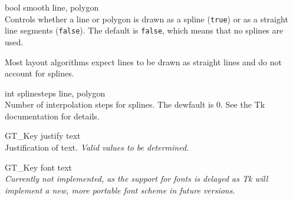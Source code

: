 \documentclass[twoside,fleqn]{report}
\begin{document}
\begin{CAttributes}
  \item[bool smooth] \hfill
  {\footnotesize line, polygon} \\
  Controls whether a line or polygon is drawn as a spline 
  (\texttt{true}) or as a straight line segments (\texttt{false}). 
  The default is \texttt{false}, which means that no splines are used.
  \begin{note}
  Most layout algorithms expect lines to be drawn as straight lines 
  and do not account for splines.
  \end{note}
      
  \item[int splinesteps] \hfill
  {\footnotesize line, polygon} \\
  Number of interpolation steps for splines.  The dewfault is 0.  See 
  the Tk documentation for details.
      
  \item[GT\_Key justify] \hfill
  {\footnotesize text} \\
  Justification of text. \emph{Valid values to be determined.}
      
  \item[GT\_Key font] \hfill
  {\footnotesize text} \\
  \emph{Currently not implemented, as the support for fonts is delayed 
  as Tk will implement a new, more portable font scheme in future 
  versions.}
        
\end{CAttributes}
\end{document}
